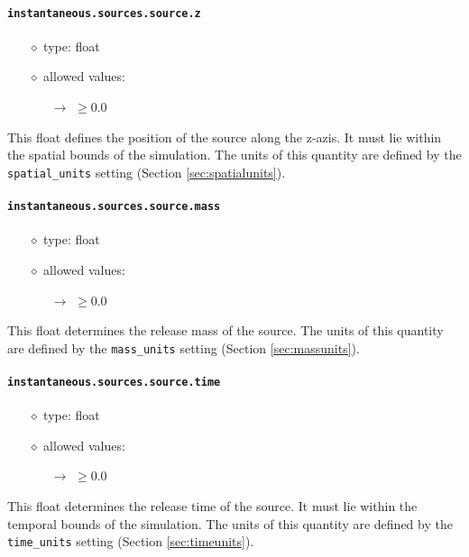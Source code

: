 \documentclass[]{article}
\def\code#1{\texttt{#1}}
\begin{document}
\paragraph{\code{instantaneous.sources.source.z}}\label{sec:instsourcez}
\begin{itemize}
    \item[$\diamond$] type: float 
    \item[$\diamond$] allowed values:
    \begin{itemize}
        \item[$\rightarrow$] $\geq0.0$
    \end{itemize}
\end{itemize}
This float defines the position of the source along the z-azis. It must lie
within the spatial bounds of the simulation. The units of this quantity are
defined by the \code{spatial\_units} setting (Section \ref{sec:spatialunits}).

\paragraph{\code{instantaneous.sources.source.mass}}\label{sec:instsourcemass}
\begin{itemize}
    \item[$\diamond$] type: float 
    \item[$\diamond$] allowed values:
    \begin{itemize}
        \item[$\rightarrow$] $\geq0.0$
    \end{itemize}
\end{itemize}
This float determines the release mass of the source. The units of this quantity
are defined by the \code{mass\_units} setting (Section
\ref{sec:massunits}).

\paragraph{\code{instantaneous.sources.source.time}}\label{sec:instsourcetime}
\begin{itemize}
    \item[$\diamond$] type: float 
    \item[$\diamond$] allowed values:
    \begin{itemize}
        \item[$\rightarrow$] $\geq0.0$
    \end{itemize}
\end{itemize}
This float determines the release time of the source. It must lie within the
temporal bounds of the simulation. The units of this quantity are defined by the
\code{time\_units} setting (Section \ref{sec:timeunits}).
\end{document}

